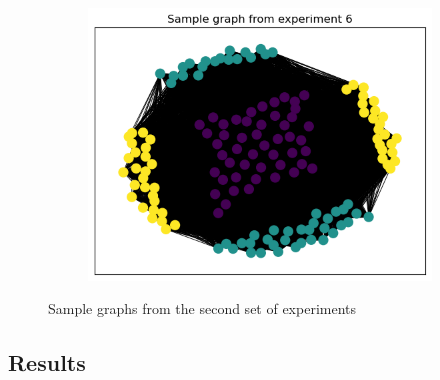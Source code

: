 \documentclass[switch, 12pt]{article}
\begin{document}
\begin{figure}[h]
\begin{subfigure}{0.28\linewidth}
        \includegraphics[width=\linewidth]{figures/exp6_sample.png}
    \end{subfigure}
    \hfill
    \caption{Sample graphs from the second set of experiments}
    \label{fig:sample_graphs}
\end{figure}

\subsection{Results}

\hphantom{.}
\end{document}

